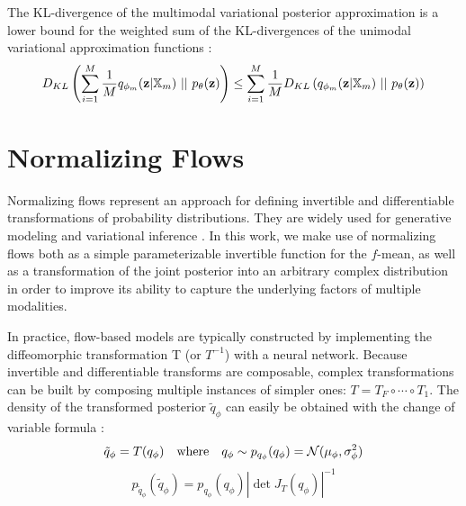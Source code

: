 \begin{lemma}
    \label{lemma:DklLowerBound}

    The KL-divergence of the multimodal variational posterior approximation is a lower bound for the weighted sum of the KL-divergences of the unimodal variational approximation functions \citep{sutter_multimodal_2020}:
    \begin{equation}
        D_{KL} \left( \sum _{i=1} ^M \frac{1}{M}q_{\phi_m}(\textbf{z}|\mathbb{X}_m)\ ||\ p_{\theta}(\textbf{z}) \right) \leq \sum _{i=1} ^M \frac{1}{M} D_{KL} \left( q_{\phi_m}(\textbf{z}|\mathbb{X}_m)\ ||\ p_{\theta}(\textbf{z}) \right)
    \end{equation}
\end{lemma}


\section{Normalizing Flows}
\label{subsec: Normalizing Flows}
Normalizing flows \parencite{papamakarios_normalizing_2019} represent an approach for defining invertible and differentiable transformations of probability distributions.
They are widely used for generative modeling \citep{dinh_density_2017, kingma_glow_2018} and variational inference \parencite{rezende_variational_2016, berg_sylvester_2019}.
In this work, we make use of normalizing flows both as a simple parameterizable invertible function for the $f$-mean, as well as a transformation of the joint posterior into an arbitrary complex distribution in order to improve its ability to capture the underlying factors of multiple modalities.

In practice, flow-based models are typically constructed by implementing the diffeomorphic transformation T (or $T^{-1}$) with a neural network.
Because invertible and differentiable transforms are composable, complex transformations can be built by composing multiple instances of simpler ones: $T=T_F \circ \cdots \circ T_1$.
The density of the transformed posterior $\tilde{q}_{\phi}$ can easily be obtained with the change of variable formula \parencite{bogachev2007measure}:
\begin{equation}
    \tilde{q}_{\phi} = T(q_{\phi}) \quad \text{where} \quad q_{\phi} \sim p_{q_{\phi}}(q_{\phi}) = \mathcal{N}(\mu_{\phi}, \sigma^2_{\phi})
\end{equation}
\begin{equation}
    \label{eq:changeofvariables}
    p_{\tilde{q}_{\phi}}(\tilde{q}_{\phi}) = p_{q_{\phi}}(q_{\phi})|\det J_T(q_{\phi})|^{-1}
\end{equation}

